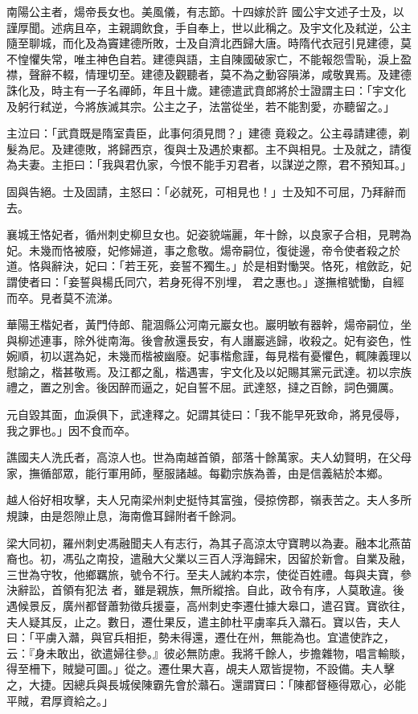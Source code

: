 \begin{pinyinscope}
 南陽公主者，煬帝長女也。美風儀，有志節。十四嫁於許
 國公宇文述子士及，以謹厚聞。述病且卒，主親調飲食，手自奉上，世以此稱之。及宇文化及弒逆，公主隨至聊城，而化及為竇建德所敗，士及自濟北西歸大唐。時隋代衣冠引見建德，莫不惶懼失常，唯主神色自若。建德與語，主自陳國破家亡，不能報怨雪恥，淚上盈襟，聲辭不輟，情理切至。建德及觀聽者，莫不為之動容隕涕，咸敬異焉。及建德誅化及，時主有一子名禪師，年且十歲。建德遣武賁郎將於士證謂主曰：「宇文化及躬行弒逆，今將族滅其宗。公主之子，法當從坐，若不能割愛，亦聽留之。」



 主泣曰：「武賁既是隋室貴臣，此事何須見問？」建德
 竟殺之。公主尋請建德，剃髮為尼。及建德敗，將歸西京，復與士及遇於東都。主不與相見。士及就之，請復為夫妻。主拒曰：「我與君仇家，今恨不能手刃君者，以謀逆之際，君不預知耳。」



 固與告絕。士及固請，主怒曰：「必就死，可相見也！」士及知不可屈，乃拜辭而去。



 襄城王恪妃者，循州刺史柳旦女也。妃姿貌端麗，年十餘，以良家子合相，見聘為妃。未幾而恪被廢，妃修婦道，事之愈敬。煬帝嗣位，復徙邊，帝令使者殺之於道。恪與辭決，妃曰：「若王死，妾誓不獨生。」於是相對慟哭。恪死，棺斂訖，妃謂使者曰：「妾誓與楊氏同穴，若身死得不別埋，
 君之惠也。」遂撫棺號慟，自經而卒。見者莫不流涕。



 華陽王楷妃者，黃門侍郎、龍涸縣公河南元巖女也。巖明敏有器幹，煬帝嗣位，坐與柳述連事，除外徙南海。後會赦還長安，有人譖巖逃歸，收殺之。妃有姿色，性婉順，初以選為妃，未幾而楷被幽廢。妃事楷愈謹，每見楷有憂懼色，輒陳義理以慰諭之，楷甚敬焉。及江都之亂，楷遇害，宇文化及以妃賜其黨元武達。初以宗族禮之，置之別舍。後因醉而逼之，妃自誓不屈。武達怒，撻之百餘，詞色彌厲。



 元自毀其面，血淚俱下，武達釋之。妃謂其徒曰：「我不能早死致命，將見侵辱，我之罪也。」因不食而卒。



 譙國夫人洗氏者，高涼人也。世為南越首領，部落十餘萬家。夫人幼賢明，在父母家，撫循部眾，能行軍用師，壓服諸越。每勸宗族為善，由是信義結於本鄉。



 越人俗好相攻擊，夫人兄南梁州刺史挺恃其富強，侵掠傍郡，嶺表苦之。夫人多所規諫，由是怨隙止息，海南儋耳歸附者千餘洞。



 梁大同初，羅州刺史馮融聞夫人有志行，為其子高涼太守寶聘以為妻。融本北燕苗裔也。初，馮弘之南投，遣融大父業以三百人浮海歸宋，因留於新會。自業及融，三世為守牧，他鄉羈旅，號令不行。至夫人誡約本宗，使從百姓禮。每與夫寶，參決辭訟，首領有犯法
 者，雖是親族，無所縱捨。自此，政令有序，人莫敢違。後遇候景反，廣州都督蕭勃徵兵援臺，高州刺史李遷仕據大皋口，遣召寶。寶欲往，夫人疑其反，止之。數日，遷仕果反，遣主帥杜平虜率兵入灨石。寶以告，夫人曰：「平虜入灨，與官兵相拒，勢未得還，遷仕在州，無能為也。宜遣使詐之，云：『身未敢出，欲遣婦往參。』彼必無防慮。我將千餘人，步擔雜物，唱言輸賧，得至柵下，賊變可圖。」從之。遷仕果大喜，覘夫人眾皆提物，不設備。夫人擊之，大捷。因總兵與長城侯陳霸先會於灨石。還謂寶曰：「陳都督極得眾心，必能平賊，君厚資給之。」




\end{pinyinscope}
